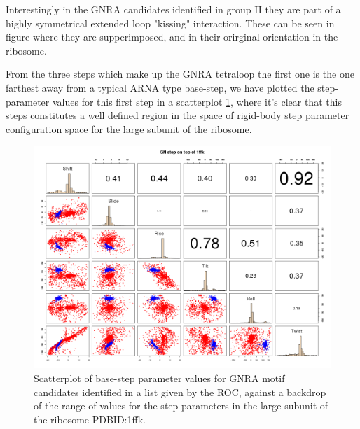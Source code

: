 Interestingly in the  GNRA candidates identified in group  II they are
part    of   a    highly   symmetrical    extended    loop   "kissing"
interaction. These can be seen in figure where they are supperimposed,
and in their orirginal orientation in the ribosome.

From the three steps which make up the GNRA tetraloop the first one is
the  one farthest away  from a  typical ARNA  type base-step,  we have
plotted the step-parameter values for this first step in a scatterplot
\ref{fig:scattergnra}, where it's clear  that this steps constitutes a
well  defined  region  in  the  space  of  rigid-body  step  parameter
configuration space for the large subunit of the ribosome.

\begin{figure}
\centering 
\includegraphics[angle=0, scale=0.5]{Chapter5/GNRAin1ffk.png}
\caption{Scatterplot  of  base-step parameter  values  for GNRA  motif
  candidates identified in a list given by the ROC, against a backdrop
  of the range of values  for the step-parameters in the large subunit
  of the ribosome PDBID:1ffk.}
\label{fig:scattergnra}
\end{figure}


